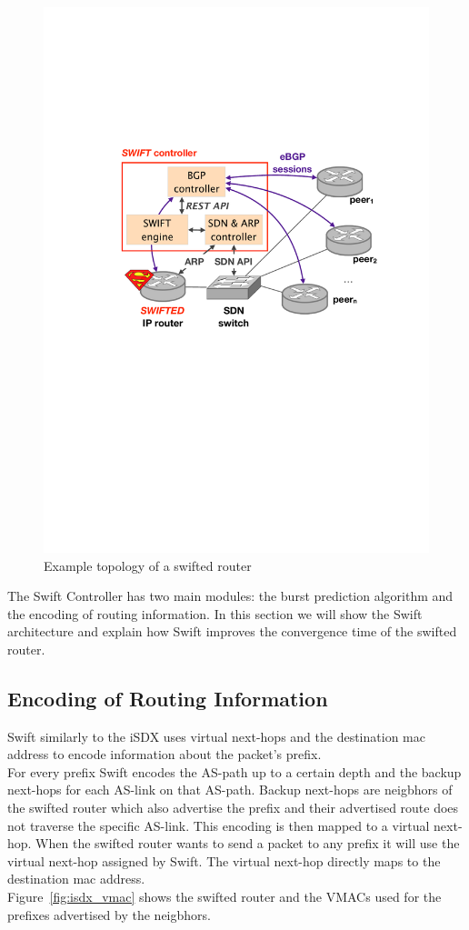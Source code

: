 \begin{figure}[h]
\center
\includegraphics[scale = 0.5]{Figures/bckgrnd_swift_architecture.pdf}
\caption{Example topology of a swifted router}
\end{figure}

The Swift Controller has two main modules: the burst prediction algorithm and the encoding of routing information. In this section we will show the Swift architecture and explain how Swift improves the convergence time of the swifted router. 

\subsection{\label{chapter2:Swift:encoding of routing information}Encoding of Routing Information}
Swift similarly to the iSDX uses virtual next-hops and the destination mac address to encode information about the packet's prefix.\\
For every prefix Swift encodes the AS-path up to a certain depth and the backup next-hops for each AS-link on that AS-path. Backup next-hops are neigbhors of the swifted router which also advertise the prefix and their advertised route does not traverse the specific AS-link. This encoding is then mapped to a virtual next-hop. When the swifted router wants to send a packet to any prefix it will use the virtual next-hop assigned by Swift. The virtual next-hop directly maps to the destination mac address. \\
Figure~\ref{fig:isdx_vmac} shows the swifted router and the VMACs used for the prefixes advertised by the neigbhors.


